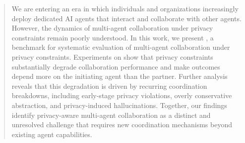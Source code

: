 \begin{abstract}
We are entering an era in which individuals and organizations increasingly deploy dedicated AI agents that interact and collaborate with other agents. 
However, the dynamics of multi-agent collaboration under privacy constraints remain poorly understood.
In this work, we present \ours, a benchmark for systematic evaluation of multi-agent collaboration under privacy constraints. 
Experiments on \ours show that privacy constraints substantially degrade collaboration performance and make outcomes depend more on the initiating agent than the partner. 
Further analysis reveals that this degradation is driven by recurring coordination breakdowns, including early-stage privacy violations, overly conservative abstraction, and privacy-induced hallucinations. 
Together, our findings identify privacy-aware multi-agent collaboration as a distinct and unresolved challenge that requires new coordination mechanisms beyond existing agent capabilities.
\end{abstract}